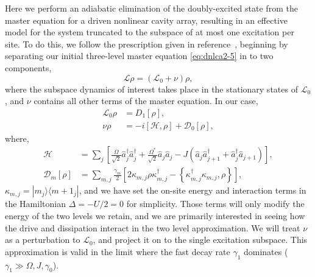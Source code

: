 Here we perform an adiabatic elimination of the doubly-excited state from the master equation for a driven nonlinear cavity array, resulting in an effective model for the system truncated to the subspace of at most one excitation per site. To do this, we follow the prescription given in reference~\cite{Garcia-Ripoll2009}, beginning by separating our initial three-level master equation \cref{eq:dnlca2-5} in to two components,
\begin{equation}
	\mathcal{L}\rho = (\mathcal{L}_{0} + \nu)\rho,
	\label{eq:adelim1}
\end{equation}
where the subspace dynamics of interest takes place in the stationary states of \(\mathcal{L}_{0}\), and \(\nu\) contains all other terms of the master equation. In our case,
\begin{align}
	\mathcal{L}_{0}\rho &= D_{1}\left[\rho\right], \label{eq:adelim2} \\
	\nu\rho &= -i\left[\mathcal{H}, \rho\right] + \mathcal{D}_{0}\left[\rho\right], \label{eq:adelim3}
\end{align}
where,
\begin{align}
	\mathcal{H} &= \sum_{j}\left[ \frac{\Omega}{\sqrt{2}}\hat{a}_{j}^{\dagger}\hat{a}_{j}^{\dagger} + \frac{\Omega^{*}}{\sqrt{2}}\hat{a}_{j}\hat{a}_{j} - J\left(\hat{a}_{j}\hat{a}_{j+1}^{\dagger} + \hat{a}_{j}^{\dagger}\hat{a}_{j+1}\right) \right], \label{eq:adelim4} \\
	\mathcal{D}_{m}\left[\rho\right] &= \sum_{m,j} \frac{\gamma_{m}}{2} \left[ 2\kappa_{m,j}\rho\kappa_{m,j}^{\dagger} - \left\{\kappa_{m,j}^{\dagger}\kappa_{m,j}, \rho\right\} \right], \label{eq:adelim5}
\end{align}
\(\kappa_{m,j} = |m_{j} \rangle\langle m +1_{j}|\), and we have set the on-site energy and interaction terms in the Hamiltonian \(\Delta = -U/2 = 0\) for simplicity. Those terms will only modify the energy of the two levels we retain, and we are primarily interested in seeing how the drive and dissipation interact in the two level approximation. We will treat \(\nu\) as a perturbation to \(\mathcal{L}_{0}\), and project it on to the single excitation subspace. This approximation is valid in the limit where the fast decay rate \(\gamma_{1}\) dominates (\(\gamma_{1} \gg \Omega, J, \gamma_{0}\)).

